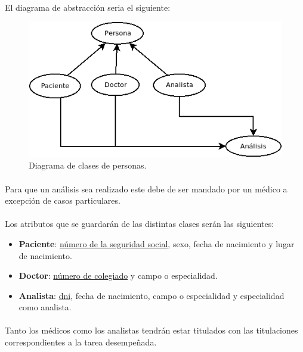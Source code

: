 \documentclass[a4paper,10pt]{article}
\begin{document}
\paragraph{}
El diagrama de abstracción seria el siguiente:
\vspace{0.5cm}
\begin{center}
\begin{figure}[hbt]
\includegraphics[width=\textwidth]{img/personas.png}
\caption{Diagrama de clases de personas.}
\label{fig:diagramapersonas}
\end{figure}
\end{center}
\paragraph{}
Para que un análisis sea realizado este debe de ser mandado por un médico a excepción de casos particulares.
\paragraph{}
Los atributos que se guardarán de las distintas clases serán las siguientes:
\begin{itemize}
\item {\bf Paciente}: \underline{número de la seguridad social}, sexo, fecha de nacimiento y lugar de nacimiento.
\item {\bf Doctor}: \underline{número de colegiado} y campo o especialidad.
\item {\bf Analista}: \underline{dni}, fecha de nacimiento, campo o especialidad y especialidad como analista.
\end{itemize}
\paragraph{}
Tanto los médicos como los analistas tendrán estar titulados con las titulaciones correspondientes a la tarea desempeñada.
\end{document}

